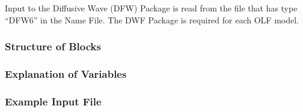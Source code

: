 Input to the Diffusive Wave (DFW) Package is read from the file that has type ``DFW6'' in the Name File.  The DWF Package is required for each OLF model. 

\vspace{5mm}
\subsubsection{Structure of Blocks}



\vspace{5mm}
\subsubsection{Explanation of Variables}
\begin{description}

\end{description}

\vspace{5mm}
\subsubsection{Example Input File}


